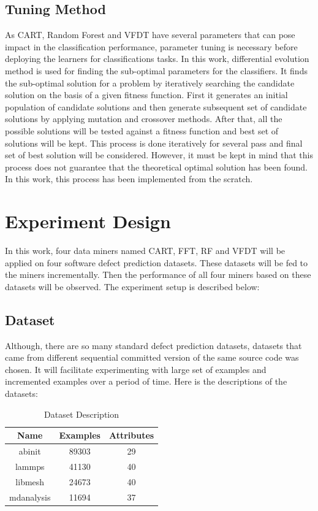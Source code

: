 \documentclass[sigplan]{acmart}\settopmatter{printfolios=true,printccs=false,printacmref=false}
\begin{document}
\subsection{Tuning Method}
As CART, Random Forest and VFDT have several parameters that can pose impact in the classification performance, parameter tuning is necessary before deploying the learners for classifications tasks. In this work, differential evolution method \cite{storn1997differential} is used for finding the sub-optimal parameters for the classifiers. It finds the sub-optimal solution for a problem by iteratively searching the candidate solution on the basis of a given fitness function. First it generates an initial population of candidate solutions and then generate subsequent set of candidate solutions by applying mutation and crossover methods. After that, all the possible solutions will be tested against a fitness function and best set of solutions will be kept. This process is done iteratively for several pass and final set of best solution will be considered. However, it must be kept in mind that this process does not guarantee that the theoretical optimal solution has been found. In this work, this process has been implemented from the scratch. 

\section{Experiment Design}
In this work, four data miners named CART, FFT, RF and VFDT will be applied on four software defect prediction datasets. These datasets will be fed to the miners incrementally. Then the performance of all four miners based on these datasets will be observed. The experiment setup is described below:

\subsection{Dataset}
Although, there are so many standard defect prediction datasets, datasets that came from different sequential committed version of the same source code was chosen. It will facilitate experimenting with large set of examples and incremented examples over a period of time. Here is the descriptions of the datasets:

\begin{center}
	\begin{table}[h]
			\begin{tabular}{|c|c|c|}
			\hline 
			\textbf{Name} & \textbf{Examples} & \textbf{Attributes} \\ 
			\hline 
			abinit & 89303 & 29 \\ 
			\hline 
			lammps & 41130 & 40 \\ 
			\hline 
			libmesh & 24673 & 40 \\ 
			\hline 
			mdanalysis & 11694 & 37 \\ 
			\hline
		\end{tabular}   
	\caption{Dataset Description}
	\label{tab:dataset}
	\end{table}
\end{center}
\end{document}
